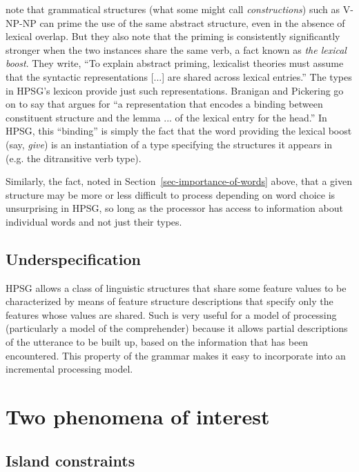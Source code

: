 \documentclass[a4paper]{article}
\begin{document}
\citet{BraniganPickering2017} note that grammatical structures (what some might call
\emph{constructions}) such as V-NP-NP can prime the use of the same abstract
structure, even in the absence of lexical overlap.  But they also note that the priming is
consistently significantly stronger when the two instances share the same verb, a fact known as
\emph{the lexical boost}.  They write, ``To explain abstract
priming, lexicalist theories must assume that the syntactic
representations [...]
are shared across lexical entries.''  The types in HPSG's lexicon provide just such representations.  Branigan and Pickering go on to say that  argues for ``a representation that
encodes a binding between constituent structure and the
lemma ... of the lexical entry for the
head.''  In HPSG, this ``binding'' is simply the fact that the word providing the lexical boost (say, \emph{give}) is an instantiation of a type specifying the structures it appears in (e.g. the ditransitive verb type).

Similarly, the fact, noted in Section~\ref{sec-importance-of-words} above, that a given structure may be more or less difficult to process depending on word choice is unsurprising in HPSG, so long as the processor has access to information about individual words and not just their types.   
\subsection{Underspecification}

HPSG allows a class of linguistic structures that share some feature values to be characterized by means of feature structure descriptions that specify only the features whose values are shared.  Such  is very useful for a model of processing (particularly a model of the comprehender) because it allows partial descriptions of the utterance to be built up, based on the information that has been encountered.  This property of the grammar makes it easy to incorporate into an incremental processing model.

\section{Two phenomena of interest}
\label{sec-phenomena-processing}

\subsection{Island constraints}
\end{document}
